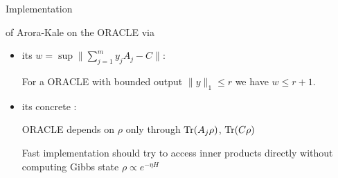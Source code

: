 \begin{frame}{Implementation}
 
  of Arora-Kale  on the ORACLE via
 \begin{itemize}
  \item<2-> its  $w = \sup \| \sum_{j=1}^m y_j A_j - C  \|$:
  
    \vspace{0.25\floatsep}
  
    For a ORACLE with bounded output $\|y\|_1 \leq r$ we have $w \leq r + 1$.
  
  \item<3-> its concrete :
  
   \vspace{0.5\floatsep}
   
   ORACLE depends on $\rho$ only through $\operatorname{Tr}(A_j \rho)$, $\operatorname{Tr}(C\rho)$
   
   \vspace{0.5\floatsep}
   
   Fast implementation should try to access inner products directly without computing Gibbs state $\rho \propto e^{-\eta H}$   
  
 \end{itemize}

\end{frame}
